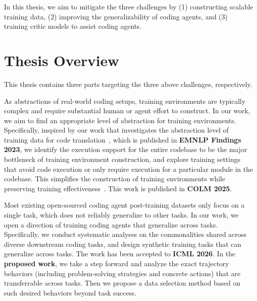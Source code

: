 \documentclass[12pt,openany]{cmuthesis}
\begin{document}
In this thesis, we aim to mitigate the three challenges by (1) constructing scalable training data, (2) improving the generalizability of coding agents, and (3) training critic models to assist coding agents.

\section{Thesis Overview}
This thesis contains three parts targeting the three above challenges, respectively.

As abstractions of real-world coding setups, training environments are typically complex and require substantial human or agent effort to construct.
In our work, we aim to find an appropriate level of abstraction for training environments.
Specifically, inspired by our work that investigates the abstraction level of training data for code translation~\cite{cmtrans}, which is published in \textcolor{aquablue}{\textbf{EMNLP Findings 2023}}, we identify the execution support for the entire codebase to be the major bottleneck of training environment construction, and explore training settings that avoid code execution or only require execution for a particular module in the codebase.
This simplifies the construction of training environments while preserving training effectiveness~\cite{repost}. This work is published in \textcolor{aquablue}{\textbf{COLM 2025}}.

Most existing open-sourced coding agent post-training datasets only focus on a single task, which does not reliably generalize to other tasks.
In our work, we open a direction of training coding agents that generalize across tasks.
Specifically, we conduct systematic analyses on the commonalities shared across diverse downstream coding tasks, and design synthetic training tasks that can generalize across tasks.
The work has been accepted to \textcolor{aquablue}{\textbf{ICML 2026}}.
In the \textbf{\textcolor{treegreen}{proposed work}}, we take a step forward and analyze the exact trajectory behaviors (including problem-solving strategies and concrete actions) that are transferrable across tasks. Then we propose a data selection method based on such desired behaviors beyond task success.
\end{document}
